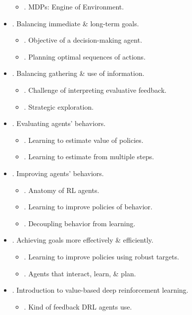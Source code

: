 \documentclass{article}
\begin{document}
\begin{itemize}
\begin{itemize}
        \item {. MDPs: Engine of Environment.}
    \end{itemize}
    \item {. Balancing immediate \& long-term goals.}
    \begin{itemize}
        \item {. Objective of a decision-making agent.}
        \item {. Planning optimal sequences of actions.}
    \end{itemize}
    \item {. Balancing gathering \& use of information.}
    \begin{itemize}
        \item {. Challenge of interpreting evaluative feedback.}
        \item {. Strategic exploration.}
    \end{itemize}
    \item {. Evaluating agents' behaviors.}
    \begin{itemize}
        \item {. Learning to estimate value of policies.}
        \item {. Learning to estimate from multiple steps.}
    \end{itemize}
    \item {. Improving agents' behaviors.}
    \begin{itemize}
        \item {. Anatomy of RL agents.}
        \item {. Learning to improve policies of behavior.}
        \item {. Decoupling behavior from learning.}
    \end{itemize}
    \item {. Achieving goals more effectively \& efficiently.}
    \begin{itemize}
        \item {. Learning to improve policies using robust targets.}
        \item {. Agents that interact, learn, \& plan.}
    \end{itemize}
    \item {. Introduction to value-based deep reinforcement learning.}
    \begin{itemize}
        \item {. Kind of feedback DRL agents use.}

\end{itemize}
\end{itemize}
\end{document}
